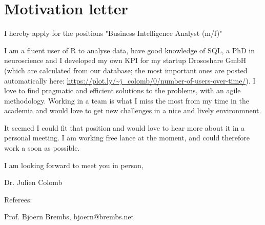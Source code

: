 \section* {Motivation letter}

I hereby apply for the  positions "Business Intelligence Analyst (m/f)" 

I am a fluent user of R to analyse data, have good knowledge of SQL, a PhD in neuroscience and I developed my own KPI for my startup Drososhare GmbH (which are calculated from our database; the most important ones are posted automatically here:  \url{https://plot.ly/~j_colomb/0/number-of-users-over-time/}).  I love to find pragmatic and efficient solutions to the problems, with an agile methodology. Working in a team is what I miss the most from my time in the academia and would love to get new challenges in a nice and lively environmnent.

It seemed I could fit that position and would love to hear more about it in a personal meeting. I am working free lance at the moment, and could therefore work a soon as possible.

I am looking forward to meet you in person,

Dr. Julien Colomb



\vspace {0.5cm} 

Referees:

Prof. Bjoern Brembs, bjoern@brembs.net
